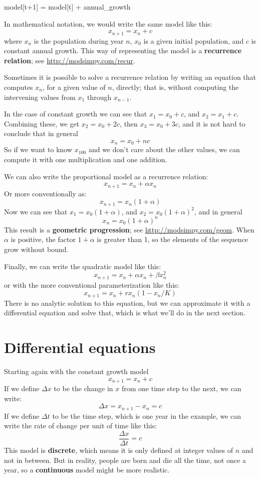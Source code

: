 \documentclass[12pt]{book}
\theoremstyle{exercise}
\begin{document}
\begin{python}
model[t+1] = model[t] + annual_growth
\end{python}

In mathematical notation, we would write the same model like this:
%
\[ x_{n+1} = x_n + c \]
%
where $x_n$ is the population during year $n$, $x_0$ is a given initial population, and $c$ is constant annual growth.  This way of representing the model is a {\bf recurrence relation}; see \url{http://modsimpy.com/recur}.


Sometimes it is possible to solve a recurrence relation by writing an equation that computes $x_n$, for a given value of $n$, directly; that is, without computing the intervening values from $x_1$ through $x_{n-1}$.

In the case of constant growth we can see that $x_1 = x_0 + c$, and $x_2 = x_1 + c$.  Combining these, we get $x_2 = x_0 + 2c$, then $x_3 = x_0 + 3c$, and it is not hard to conclude that in general
%
\[ x_n = x_0 + nc \]
%
So if we want to know $x_{100}$ and we don't care about the other values, we can compute it with one multiplication and one addition.

We can also write the proportional model as a recurrence relation:
%
\[ x_{n+1} = x_n + \alpha x_n \]
%
Or more conventionally as:
%
\[ x_{n+1} = x_n (1 + \alpha) \]
%
Now we can see that $x_1 = x_0 (1 + \alpha)$, and $x_2 = x_0 (1 + \alpha)^2$, and in general
%
\[ x_n = x_0 (1 + \alpha)^n \]
%
This result is a {\bf geometric progression}; see \url{http://modsimpy.com/geom}.  When $\alpha$ is positive, the factor $1+\alpha$ is greater than 1, so the elements of the sequence grow without bound.


Finally, we can write the quadratic model like this:
%
\[ x_{n+1} = x_n + \alpha x_n + \beta x_n^2 \]
%
or with the more conventional parameterization like this:
%
\[ x_{n+1} = x_n + r x_n (1 - x_n / K) \]
%
There is no analytic solution to this equation, but we can approximate it with a differential equation and solve that, which is what we'll do in the next section.


\section{Differential equations}
\label{diffeq}

Starting again with the constant growth model
%
\[ x_{n+1} = x_n + c \]
%
If we define $\Delta x$ to be the change in $x$ from one time step to the next, we can write:
%
\[ \Delta x = x_{n+1} - x_n = c \]
%
If we define $\Delta t$ to be the time step, which is one year in the example, we can write the rate of change per unit of time like this:
%
\[ \frac{\Delta x}{\Delta t} = c \]
%
This model is {\bf discrete}, which means it is only defined at integer values of $n$ and not in between.  But in reality, people are born and die all the time, not once a year, so a {\bf continuous} model might be more realistic.
\end{document}

